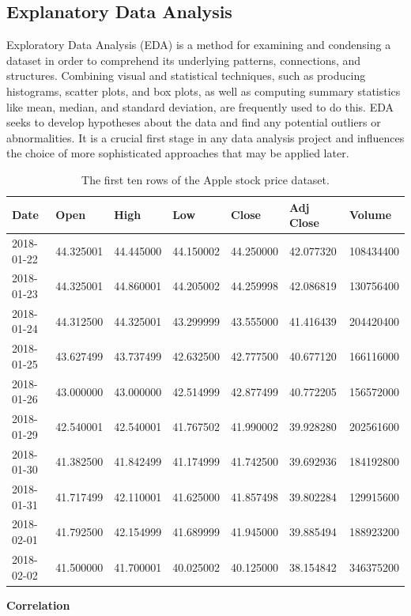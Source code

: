 \documentclass[a4paper]{article}
\begin{document}
\subsection{Explanatory Data Analysis}
Exploratory Data Analysis (EDA) is a method for examining and condensing a dataset in order to comprehend its underlying patterns, connections, and structures. Combining visual and statistical techniques, such as producing histograms, scatter plots, and box plots, as well as computing summary statistics like mean, median, and standard deviation, are frequently used to do this. EDA seeks to develop hypotheses about the data and find any potential outliers or abnormalities. It is a crucial first stage in any data analysis project and influences the choice of more sophisticated approaches that may be applied later.

\begin{table}[!h]
    \centering
    \caption{The first ten rows of the Apple stock price dataset.}
    \vspace{5pt}
    \begin{tabular}{|l|l|l|l|l|l|l|}
    \hline
        \textbf{Date} & \textbf{Open} & \textbf{High} & \textbf{Low} & \textbf{Close} & \textbf{Adj Close} & \textbf{Volume} \\ \hline
        2018-01-22 & 44.325001 & 44.445000 & 44.150002 & 44.250000 & 42.077320 & 108434400 \\ \hline
        2018-01-23 & 44.325001 & 44.860001 & 44.205002 & 44.259998 & 42.086819 & 130756400 \\ \hline
        2018-01-24 & 44.312500 & 44.325001 & 43.299999 & 43.555000 & 41.416439 & 204420400 \\ \hline
        2018-01-25 & 43.627499 & 43.737499 & 42.632500 & 42.777500 & 40.677120 & 166116000 \\ \hline
        2018-01-26 & 43.000000 & 43.000000 & 42.514999 & 42.877499 & 40.772205 & 156572000 \\ \hline
        2018-01-29 & 42.540001 & 42.540001 & 41.767502 & 41.990002 & 39.928280 & 202561600 \\ \hline
        2018-01-30 & 41.382500 & 41.842499 & 41.174999 & 41.742500 & 39.692936 & 184192800 \\ \hline
        2018-01-31 & 41.717499 & 42.110001 & 41.625000 & 41.857498 & 39.802284 & 129915600 \\ \hline
        2018-02-01 & 41.792500 & 42.154999 & 41.689999 & 41.945000 & 39.885494 & 188923200 \\ \hline
        2018-02-02 & 41.500000 & 41.700001 & 40.025002 & 40.125000 & 38.154842 & 346375200 \\ \hline
    \end{tabular}
\end{table}
\textbf{Correlation}
\end{document}
